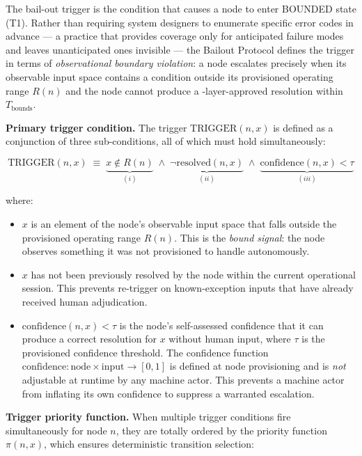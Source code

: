 The bail-out trigger is the condition that causes a node to enter BOUNDED state (T1). Rather than requiring system designers to enumerate specific error codes in advance — a practice that provides coverage only for anticipated failure modes and leaves unanticipated ones invisible — the Bailout Protocol defines the trigger in terms of \emph{observational boundary violation}: a node escalates precisely when its observable input space contains a condition outside its provisioned operating range $R(n)$ and the node cannot produce a \fact-layer-approved resolution within $T_{\text{bounds}}$.

\bigskip
\noindent\textbf{Primary trigger condition.} The trigger $\text{TRIGGER}(n, x)$ is defined as a conjunction of three sub-conditions, all of which must hold simultaneously:

\begin{equation}
\text{TRIGGER}(n, x) \;\equiv\; \underbrace{x \notin R(n)}_{(i)} \;\land\; \underbrace{\neg\text{resolved}(n, x)}_{(ii)} \;\land\; \underbrace{\text{confidence}(n, x) < \tau}_{(iii)} \tag{TC}
\end{equation}

where:

\begin{itemize}\itemsep=0pt
\item[(i)] $x$ is an element of the node's observable input space that falls outside the provisioned operating range $R(n)$. This is the \emph{bound signal}: the node observes something it was not provisioned to handle autonomously.

\item[(ii)] $x$ has not been previously resolved by the node within the current operational session. This prevents re-trigger on known-exception inputs that have already received human adjudication.

\item[(iii)] $\text{confidence}(n, x) < \tau$ is the node's self-assessed confidence that it can produce a correct resolution for $x$ without human input, where $\tau$ is the provisioned confidence threshold. The confidence function $\text{confidence} : \text{node} \times \text{input} \rightarrow [0, 1]$ is defined at node provisioning and is \emph{not} adjustable at runtime by any machine actor. This prevents a machine actor from inflating its own confidence to suppress a warranted escalation.
\end{itemize}

\bigskip
\noindent\textbf{Trigger priority function.} When multiple trigger conditions fire simultaneously for node $n$, they are totally ordered by the priority function $\pi(n, x)$, which ensures deterministic transition selection:

